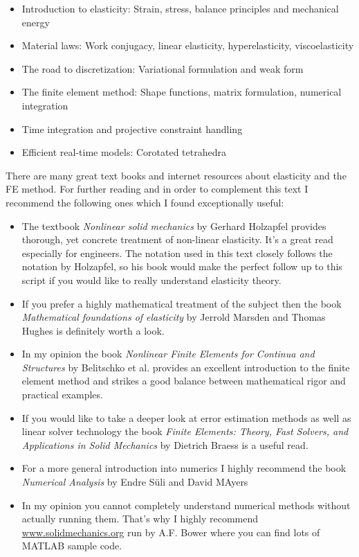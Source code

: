 \begin{itemize}

		\item Introduction to elasticity: Strain, stress, balance principles and mechanical energy
		\item Material laws: Work conjugacy, linear elasticity, hyperelasticity, viscoelasticity
		\item The road to discretization: Variational formulation and weak form
		\item The finite element method: Shape functions, matrix formulation, numerical integration
		\item Time integration and projective constraint handling
		\item Efficient real-time models: Corotated tetrahedra
			
\end{itemize}

There are many great text books and internet resources about elasticity and the FE method. For further reading and in order to complement this text I recommend the following ones which I found exceptionally useful:

\begin{itemize}

		\item The textbook \emph{Nonlinear solid mechanics} by Gerhard Holzapfel provides thorough, yet concrete treatment of non-linear elasticity. It's a great read especially for engineers. The notation used in this text closely follows the notation by Holzapfel, so his book would make the perfect follow up to this script if you would like to really understand elasticity theory.
			\item If you prefer a highly mathematical treatment of the subject then the book \emph{Mathematical foundations of elasticity} by Jerrold Marsden and Thomas Hughes is definitely worth a look.
			\item In my opinion the book \emph{Nonlinear Finite Elements for Continua and Structures} by Belitschko et al. provides an excellent introduction to the finite element method and strikes a good balance between mathematical rigor and practical examples.
			\item If you would like to take a deeper look at error estimation methods as well as linear solver technology the book \emph{Finite Elements: Theory, Fast Solvers, and Applications in Solid Mechanics} by Dietrich Braess is a useful read.
			\item For a more general introduction into numerics I highly recommend the book \emph{Numerical Analysis} by Endre S\"uli and David MAyers
			\item In my opinion you cannot completely understand numerical methods without actually running them. That's why I highly recommend \url{www.solidmechanics.org} run by A.F. Bower where you can find lots of MATLAB sample code. 			
			
\end{itemize}

